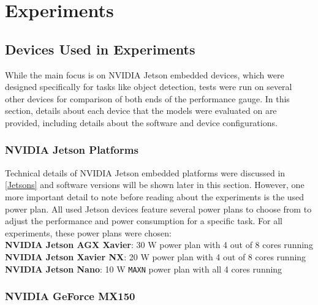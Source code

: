 




\chapter{Experiments}
\label{Experiments}


\section{Devices Used in Experiments}

While the main focus is on NVIDIA Jetson embedded devices, which were designed
specifically for tasks like object detection, tests were run on several other
devices for comparison of both ends of the performance gauge. In this section,
details about each device that the models were evaluated on are provided,
including details about the software and device configurations.


\subsection{NVIDIA Jetson Platforms}

Technical details of NVIDIA Jetson embedded platforms were discussed in
\autoref{Jetsons} and software versions will be shown later in this section.
However, one more important detail to note before reading about the experiments
is the used power plan. All used Jetson devices feature several power plans to
choose from to adjust the performance and power consumption for a specific task.
For all experiments, these power plans were chosen: \\
\textbf{NVIDIA Jetson AGX Xavier}: 30 W power plan with 4 out of 8 cores running \\
\textbf{NVIDIA Jetson Xavier NX}: 20 W power plan with 4 out of 8 cores running \\
\textbf{NVIDIA Jetson Nano}: 10 W \texttt{MAXN} power plan with all 4 cores running


\subsection{NVIDIA GeForce MX150}

